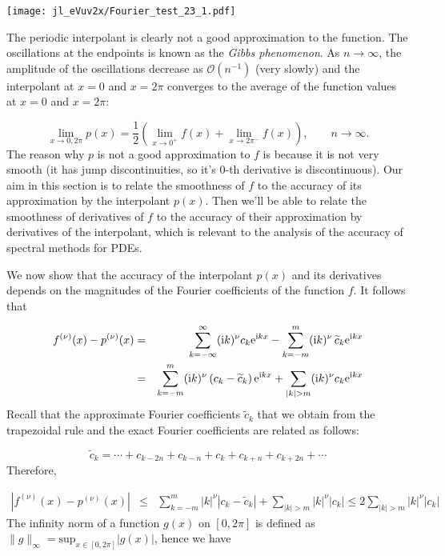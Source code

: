 \documentclass[12pt,a4paper]{article}
\begin{document}
\texttt{[image: jl\_eVuv2x/Fourier\_test\_23\_1.pdf]}

The periodic interpolant is clearly not a good approximation to the function.  The oscillations at the endpoints is known as the \emph{Gibbs phenomenon}.  As $n \to \infty$, the amplitude of the oscillations decrease as $\mathcal{O}(n^{-1})$ (very slowly) and the interpolant at $x=0$ and $x =2\pi$ converges to the average of the function values at  $x=0$ and $x =2\pi$:

\[
\lim_{x\to 0, 2\pi}p(x) = \frac{1}{2}\left(\lim_{x \to 0^{+}}f(x) + \lim_{x \to 2\pi^{-}}f(x)\right), \qquad n \to \infty.
\]
The reason why $p$ is not a good approximation to $f$ is because it is not very smooth (it has jump discontinuities, so it's $0$-th derivative is discontinuous). Our aim in this section is to relate the smoothness of $f$ to the accuracy of its approximation by the interpolant $p(x)$.  Then we'll be able to relate the smoothness of derivatives of $f$ to the accuracy of their approximation by derivatives of the interpolant, which is relevant to the analysis of the accuracy of spectral methods for PDEs.

We now show that the accuracy of the interpolant $p(x)$ and its derivatives depends on the magnitudes of the Fourier coefficients of the function $f$. It follows that


\begin{eqnarray*}
f^{(\nu)}(x) - p^{(\nu)}(x) & = & \sum_{k=-\infty}^{\infty}({\rm i}k)^{\nu}c_k{\rm e}^{{\rm i}kx} - \sum_{k=-m}^{m}({\rm i}k)^{\nu}\,\widetilde{c}_k{\rm e}^{{\rm i}kx} \\
 &=& \sum_{k=-m}^{m}({\rm i}k)^{\nu}\left(c_k - \widetilde{c}_k\right){\rm e}^{{\rm i}kx} + \sum_{\vert k \vert > m} ({\rm i}k)^{\nu}c_k{\rm e}^{{\rm i}kx}
\end{eqnarray*}
Recall that the approximate Fourier coefficients $\widetilde{c}_k$ that we obtain from the trapezoidal rule and the exact Fourier coefficients are related as follows:

\[
\widetilde{c}_k = \cdots + c_{k-2n} + c_{k-n} +  c_k +  c_{k+n} + c_{k+2n} + \cdots
\]
Therefore,


\begin{eqnarray}
\left\vert f^{(\nu)}(x) - p^{(\nu)}(x) \right\vert & \leq &  \sum_{k=-m}^{m} \vert k\vert^{\nu}\left\vert c_k - \widetilde{c}_k\right\vert + \sum_{\vert k \vert > m} \vert k \vert^{\nu} \vert c_k \vert \leq  2\sum_{\vert k \vert > m} \vert k \vert^{\nu} \vert c_k \vert 
\end{eqnarray}
The infinity norm of a function $g(x)$ on $[0, 2\pi]$ is defined as $\| g \|_{\infty} = \mathrm{sup}_{x\in[0,2\pi]} \vert g(x) \vert$, hence we have
\end{document}
